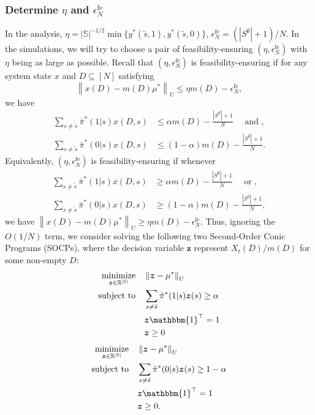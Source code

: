 \documentclass[11pt,letterpaper]{article}
\theoremstyle{plain}
\theoremstyle{definition}
\theoremstyle{remark}
\newcommand{\norm}[1]{\left\lVert#1\right\rVert}
\newcommand{\R}{\mathbb{R}}
\newcommand{\ve}[1]{\bm{#1}}
\newcommand{\vone}{\mathbbm{1}}
\newcommand{\sspa}{\mathbb{S}}
\newcommand{\pibar}{{\sysbar{\pi}}}
\newcommand{\pibs}{{\pibar^*}}
\newcommand{\sysbar}[1]{\bar{#1}}
\newcommand{\sempty}{S^{\emptyset}}
\newcommand{\statdist}{\mu^*}
\newcommand{\umat}{U}
\newcommand{\errfe}{\epsilon_N^{\text{fe}}}
\newcommand{\sneu}{\tilde{s}}
\begin{document}
\subsubsection{Determine $\eta$ and $\errfe$}
In the analysis, $\eta = |\sspa|^{-1/2} \min\{y^*(\sneu,1), y^*(\sneu,0)\}$, $\errfe = (|\sempty|+1)/N$.
In the simulations, we will try to choose a pair of feasibility-ensuring $(\eta, \errfe)$ with $\eta$ being as large as possible. 
Recall that $(\eta, \errfe)$ is feasibility-ensuring if for any system state $x$ and $D\subseteq[N]$ satisfying
\begin{equation}
    \label{eq:feasible-ensuring-exp-restate}
    \norm{x(D) - m(D)\statdist}_U \leq \eta m(D) - \errfe,
\end{equation}
we have
\begin{align}
    \label{eq:lp-priority-condition-1-restate}
    \sum_{s\neq \sneu} \pibs(1|s) x(D,s) &\leq \alpha m(D) - \frac{|\sempty|+1}{N}  \quad \text{ and },\\
    \label{eq:lp-priority-condition-2-restate}
    \sum_{s\neq \sneu} \pibs(0|s) x(D, s) &\leq (1-\alpha) m(D) - \frac{|\sempty|+1}{N}.
\end{align}
Equivalently, $(\eta, \errfe)$ is feasibility-ensuring if whenever 
\begin{align}
    \label{eq:lp-priority-condition-1-converse}
    \sum_{s\neq \sneu} \pibs(1|s) x(D, s) &\geq  \alpha m(D) - \frac{|\sempty|+1}{N} \quad \text{ or },\\
    \label{eq:lp-priority-condition-2-converse}
    \sum_{s\neq \sneu} \pibs(0|s) x(D, s) &\geq (1-\alpha)m(D) - \frac{|\sempty|+1}{N},
\end{align}
we have $\norm{x(D) - m(D) \statdist}_\umat \geq \eta m(D) - \errfe$. 
Thus, ignoring the $O(1/N)$ term, we consider solving the following two Second-Order Conic Programs (SOCPs), where the decision variable $\ve{z}$ represent $X_t(D) / m(D)$ for some non-empty $D$:
\begin{subequations}
\begin{align}
    \label{eq:solve-eta-1-begins}
    \underset{\ve{z}\in \R^{|\sspa|}}{\text{minimize}} \quad &   \norm{\ve{z} - \statdist}_{\umat}  \\
    \text{subject to} \quad & \sum_{s\neq \sneu} \pibs(1|s) \ve{z}(s) \geq \alpha \\
    & \ve{z} \vone^\top = 1\\
    \label{eq:solve-eta-1-ends}
    & \ve{z} \geq 0 
\end{align}
\end{subequations}
\begin{subequations}
\begin{align}
    \label{eq:solve-eta-2-begins}
    \underset{\ve{z}\in \R^{|\sspa|}}{\text{minimize}} \quad &   \norm{\ve{z} - \statdist}_{U}  \\
    \text{subject to} \quad & \sum_{s\neq \sneu} \pibs(0|s) \ve{z}(s) \geq 1-\alpha \\
    & \ve{z} \vone^\top = 1\\
    \label{eq:solve-eta-2-ends}
    & \ve{z} \geq 0.
\end{align}
\end{subequations}
\end{document}
